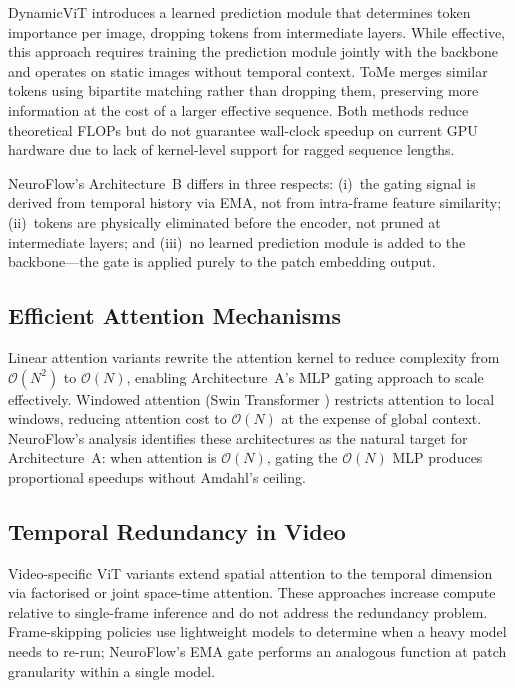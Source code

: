 \documentclass{article}
\begin{document}
DynamicViT \cite{rao2021dynamicvit} introduces a learned prediction module
that determines token importance per image, dropping tokens from
intermediate layers. While effective, this approach requires training the
prediction module jointly with the backbone and operates on static images
without temporal context. ToMe \cite{bolya2023tokenmergingvitfaster}
merges similar tokens using bipartite matching rather than dropping them,
preserving more information at the cost of a larger effective sequence.
Both methods reduce theoretical FLOPs but do not guarantee wall-clock
speedup on current GPU hardware due to lack of kernel-level support for
ragged sequence lengths.

NeuroFlow's Architecture~B differs in three respects: (i)~the gating
signal is derived from temporal history via EMA, not from intra-frame
feature similarity; (ii)~tokens are physically eliminated before the
encoder, not pruned at intermediate layers; and (iii)~no learned
prediction module is added to the backbone---the gate is applied purely
to the patch embedding output.

\subsection{Efficient Attention Mechanisms}

Linear attention variants \cite{katharopoulos2020transformers,choromanski2021rethinking}
rewrite the attention kernel to reduce complexity from $\mathcal{O}(N^2)$
to $\mathcal{O}(N)$, enabling Architecture~A's MLP gating approach to scale
effectively. Windowed attention (Swin Transformer \cite{liu2021swin})
restricts attention to local windows, reducing attention cost to $\mathcal{O}(N)$
at the expense of global context. NeuroFlow's analysis identifies these
architectures as the natural target for Architecture~A: when attention is
$\mathcal{O}(N)$, gating the $\mathcal{O}(N)$ MLP produces proportional
speedups without Amdahl's ceiling.

\subsection{Temporal Redundancy in Video}

Video-specific ViT variants \cite{arnab2021vivit,bertasius2021spacetime}
extend spatial attention to the temporal dimension via factorised or joint
space-time attention. These approaches increase compute relative to
single-frame inference and do not address the redundancy problem.
Frame-skipping policies \cite{wu2019longterm} use lightweight models to
determine when a heavy model needs to re-run; NeuroFlow's EMA gate
performs an analogous function at patch granularity within a single model.
\end{document}
